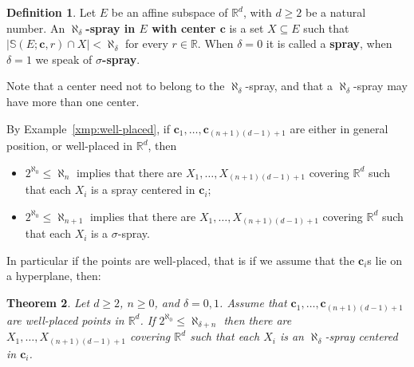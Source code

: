 \documentclass[12pt]{amsart}
\newcommand{\R}{\mathbb{R}}	%
\newcommand{\markdef}[1]{\textbf{#1}} %
\newcommand{\card}[1]{\mathopen | #1 \mathclose |}		%
\theoremstyle{plain}
\newtheorem{theorem}{Theorem}[section]
\theoremstyle{definition}
\newtheorem{definition}[theorem]{Definition}
\theoremstyle{remark}
\begin{document}
\begin{definition}\label{def:spray}
Let \( E \) be an affine subspace of \( \R^d \), with \( d \geq 2 \) be a natural number.
An \markdef{\( \aleph_ \delta \)-spray in \( E \) with center \( \mathbf{c} \)} is a set \( X \subseteq E \) such that \( \card{ \mathbb{S} ( E ; \mathbf{c} , r ) \cap X } < \aleph_ \delta \) for every \( r \in \R \).
When \( \delta = 0 \) it is called a \markdef{spray}, when \( \delta = 1 \) we speak of \markdef{\( \sigma \)-spray}.
\end{definition}

Note that a center need not to belong to the \( \aleph_ \delta \)-spray, and that a \( \aleph_ \delta \)-spray may have more than one center.

By Example~\ref{xmp:well-placed}, if \( \mathbf{c}_1 , \dots , \mathbf{c}_{ ( n + 1 ) ( d - 1 ) + 1 } \) are either in general position, or well-placed in \( \R^d \), then 
\begin{itemize}
\item
\( 2^{\aleph_0} \leq \aleph_n \) implies that there are \( X_1 , \dots , X_{ ( n + 1 ) ( d - 1 ) + 1 } \) covering \( \R^d \) such that each \( X_i \) is a spray centered in \( \mathbf{c}_i \);
\item
\( 2^{\aleph_0} \leq \aleph_{ n + 1 } \) implies that there are \( X_1 , \dots , X_{ ( n + 1 ) ( d - 1 ) + 1 } \) covering \( \R^d \) such that each \( X_i \) is a \( \sigma \)-spray.
\end{itemize}

In particular if the points are well-placed, that is if we assume that the \( \mathbf{c}_i \)s lie on a hyperplane, then:

\begin{theorem}\label{th:boundoncontinuum=>R^dcoveredwithkappasprays}
Let \( d \geq 2 \), \( n \geq 0\), and \( \delta = 0 , 1 \).
Assume that \( \mathbf{c}_1 , \dots , \mathbf{c}_{ ( n + 1 ) (d - 1 ) + 1 } \) are well-placed points in \( \R^d \).
If \( 2^{\aleph_0 } \leq \aleph_{ \delta + n } \) then there are \( X_1 , \dots , X_{ ( n + 1 ) ( d - 1 ) + 1 } \) covering \( \R^d \) such that each \( X_i \) is an \( \aleph_ \delta \)-spray centered in \( \mathbf{c}_i \).
\end{theorem}
\end{document}
